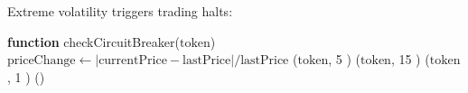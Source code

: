 Extreme volatility triggers trading halts:

\begin{algorithm}
\caption{Circuit Breaker Mechanism}
\begin{algorithmic}[1]
\STATE \textbf{function} checkCircuitBreaker($\text{token}$)
\STATE $\text{priceChange} \gets |\text{currentPrice} - \text{lastPrice}| / \text{lastPrice}$
    \STATE {}($\text{token}$, 5 )
    \STATE {}($\text{token}$, 15 )
    \STATE {}($\text{token}$, 1 )
\ENDIF
\STATE {}()
\end{algorithmic}
\end{algorithm}


